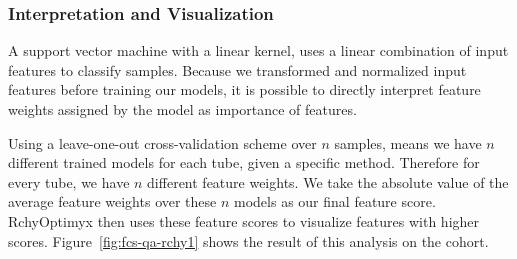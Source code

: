 \subsubsection{Interpretation and Visualization}
A support vector machine with a linear kernel, uses a linear combination of input features to classify samples. Because we transformed and normalized input features before training our models, it is possible to directly interpret feature weights assigned by the model as importance of features.

Using a leave-one-out cross-validation scheme over $n$ samples, means we have $n$ different trained models for each tube, given a specific method. Therefore for every tube, we have $n$ different feature weights. We take the absolute value of the average feature weights over these $n$ models as our final feature score. RchyOptimyx then uses these feature scores to visualize features with higher scores. Figure~\ref{fig:fcs-qa-rchy1} shows the result of this analysis on the cohort.

